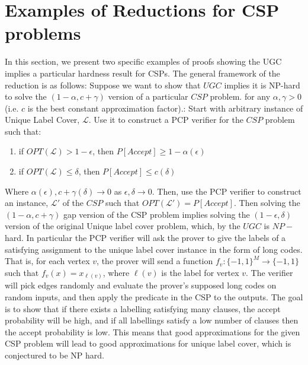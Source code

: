 \documentclass{article}
\newcommand{\1}{\mathbbm{1}}
\begin{document}
\section*{Examples of Reductions for CSP problems}
In this section, we present two specific examples of proofs showing the UGC implies a particular hardness result for CSPs. The general framework of the reduction is as follows: Suppose we want to show that $UGC$ implies it is NP-hard to solve the $(1-\alpha, c+\gamma)$ version of a particular $CSP$ problem. for any $\alpha, \gamma > 0$ (i.e. $c$ is the best constant approximation factor).: Start with arbitrary instance of Unique Label Cover, $\mathcal{L}$. Use it to construct a PCP verifier for the $CSP$ problem such that:
\begin{enumerate}[1)]
            \item if $OPT(\mathcal{L}) > 1-\epsilon$, then $P[Accept] \geq 1-\alpha(\epsilon)$
            \item if $OPT(\mathcal{L}) \leq \delta$, then $P[Accept] \leq c(\delta)$
\end{enumerate}
Where $\alpha(\epsilon), c+\gamma(\delta)\rightarrow 0$ as $\epsilon,\delta\rightarrow 0$. Then, use the PCP verifier to construct an instance, $\mathcal{L}'$ of the $CSP$ such that $OPT(\mathcal{L}') = P[Accept]$. Then solving the $(1-\alpha, c+\gamma)$ gap version of the CSP problem implies solving the $(1-\epsilon, \delta)$ version of the original Unique label cover problem, which, by the $UGC$ is $NP-$hard. In particular the PCP verifier will ask the prover to give the labels of a satisfying assignment to the unique label cover instance in the form of long codes. That is, for each vertex $v$, the prover will send a function $f_v:\{-1,1\}^M\rightarrow \{-1,1\}$ such that $f_v(x) = x_{\ell(v)}$, where $\ell(v)$ is the label for vertex $v$. The verifier will pick edges randomly and evaluate the prover's supposed long codes on random inputs, and then apply the predicate in the CSP to the outputs. The goal is to show that if there exists a labelling satisfying many clauses, the accept probability will be high, and if all labellings satisfy a low number of clauses then the accept probability is low. This means that good approximations for the given CSP problem will lead to good approximations for unique label cover, which is conjectured to be NP hard.
\end{document}
